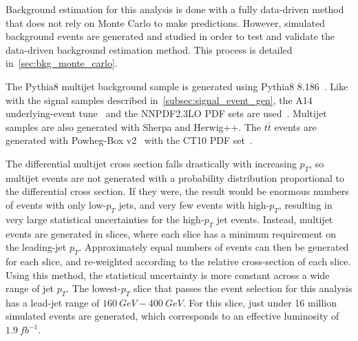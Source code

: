 Background estimation for this analysis is done with a fully data-driven method that does not rely on Monte Carlo to make predictions.
However, simulated background events are generated and studied in order to test and validate the data-driven background estimation method.
This process is detailed in~\ref{sec:bkg_monte_carlo}.

The Pythia8 multijet background sample is generated using Pythia8 8.186~\cite{signal-pythia}.
Like with the signal samples described in~\ref{subsec:signal_event_gen}, the A14 underlying-event tune~\cite{signal-pythia,signal-pythia-a14} and the NNPDF2.3LO PDF sets are used~\cite{signal-nnpdf}.
Multijet samples are also generated with Sherpa and Herwig++.
The $t\bar{t}$ events are generated with Powheg-Box v2~\cite{mc-powheg} with the CT10 PDF set~\cite{mc-ct10-pdf}.

The differential multijet cross section falls drastically with increasing $p_{T}$, so multijet events are not generated with a probability distribution proportional to the differential cross section.
If they were, the result would be enormous numbers of events with only low-$p_{T}$ jets, and very few events with high-$p_{T}$, resulting in very large statistical uncertainties for the high-$p_{T}$ jet events.
Instead, multijet events are generated in slices, where each slice has a minimum requirement on the leading-jet $p_{T}$.
Approximately equal numbers of events can then be generated for each slice, and re-weighted according to the relative cross-section of each slice.
Using this method, the statistical uncertainty is more constant across a wide range of jet $p_{T}$.
The lowest-$p_{T}$ slice that passes the event selection for this analysis has a lead-jet range of $160~GeV - 400~GeV$.
For this slice, just under 16 million simulated events are generated, which corresponds to an effective luminosity of $1.9~fb^{-1}$.